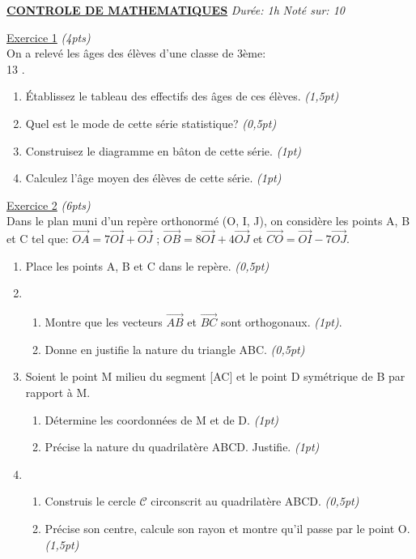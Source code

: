 \documentclass[12pt,a4paper]{book}
\newcommand{\matiere}{MATHEMATIQUES}
\begin{document}
\textbf{\underline{CONTROLE DE \matiere}} \qquad \qquad  \qquad \qquad \emph{Durée: 1h} \qquad \qquad \emph{Noté sur: 10} \\
\par
\underline{Exercice 1} \emph{(4pts)}\\
On a relevé les âges des élèves d'une classe de 3ème:\\
13                                       .
\begin{enumerate}
\item Établissez le tableau des effectifs des âges de ces élèves. \emph{(1,5pt)}
\item Quel est le mode de cette série statistique? \emph{(0,5pt)}
\item Construisez le diagramme en bâton de cette série. \emph{(1pt)}
\item Calculez l'âge moyen des élèves de cette série. \emph{(1pt)}
\end{enumerate}
\vspace{0,5cm}
\underline{Exercice 2} \emph{(6pts)} \\
Dans le plan muni d'un repère orthonormé (O, I, J), on considère les points A, B et C tel que: $\overrightarrow{OA}=7\overrightarrow{OI}+\overrightarrow{OJ}$ ; $\overrightarrow{OB}=8\overrightarrow{OI}+4\overrightarrow{OJ}$ et $\overrightarrow{CO}=\overrightarrow{OI}-7\overrightarrow{OJ}$.
\begin{enumerate}
\item Place les points A, B et C dans le repère. \emph{(0,5pt)}
\item \begin{enumerate}
\item Montre que les vecteurs $\overrightarrow{AB}$ et $\overrightarrow{BC}$ sont orthogonaux. \emph{(1pt)}.
\item Donne en justifie la nature du triangle ABC. \emph{(0,5pt)}
\end{enumerate}
\item Soient le point M milieu du segment [AC] et le point D symétrique de B par rapport à M.
\begin{enumerate}
\item Détermine les coordonnées de M et de D. \emph{(1pt)}
\item Précise la nature du quadrilatère ABCD. Justifie. \emph{(1pt)}
\end{enumerate} 
\item \begin{enumerate}
\item Construis le cercle $\mathcal{C}$ circonscrit au quadrilatère ABCD. \emph{(0,5pt)}
\item Précise son centre, calcule son rayon et montre qu'il passe par le point O. \emph{(1,5pt)}
\end{enumerate}
\end{enumerate}
\end{document}
